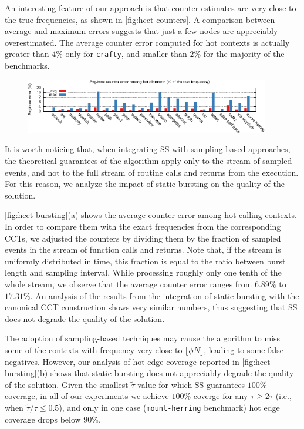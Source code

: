 An interesting feature of our approach is that counter estimates are very close to the true frequencies, as shown in \myfigure\ref{fig:hcct-counters}. A comparison between average and maximum errors suggests that just a few nodes are appreciably overestimated. The average counter error computed for hot contexts is actually greater than $4\%$ only for {\tt crafty}, and smaller than $2\%$ for the majority of the benchmarks.

\ifdefined\noauthorea
\begin{figure}[!ht]
\begin{center}
\includegraphics[width=0.95\textwidth]{figures/hcct-counters/hcct-counters.eps}\\
\caption{\protect}
\end{center}
\end{figure}
\fi

It is worth noticing that, when integrating SS with sampling-based approaches, the theoretical guarantees of the algorithm apply only to the stream of sampled events, and not to the full stream of routine calls and returns from the execution. For this reason, we analyze the impact of static bursting on the quality of the solution.

\myfigure\ref{fig:hcct-bursting}(a) shows the average counter error among hot calling contexts. In order to compare them with the exact frequencies from the corresponding CCTs, we adjusted the counters by dividing them by the fraction of sampled events in the stream of function calls and returns. Note that, if the stream is uniformly distributed in time, this fraction is equal to the ratio between burst length and sampling interval. While processing roughly only one tenth of the whole stream, we observe that the average counter error ranges from $6.89\%$ to $17.31\%$. An analysis of the results from the integration of static bursting with the canonical CCT construction shows very similar numbers, thus suggesting that SS does not degrade the quality of the solution.

The adoption of sampling-based techniques may cause the algorithm to miss some of the contexts with frequency very close to $\lfloor\phi N\rfloor$,  leading to some false negatives. However, our analysis of hot edge coverage reported in \myfigure\ref{fig:hcct-bursting}(b) shows that static bursting does not appreciably degrade the quality of the solution. Given the smallest $\widetilde\tau$ value for which SS guarantees $100\%$ coverage, in all of our experiments we achieve $100\%$ coverge for any $\tau\ge2\widetilde\tau$ (i.e., when $\widetilde\tau/\tau\le0.5$), and only in one case ({\tt mount-herring} benchmark) hot edge coverage drops below $90\%$.

